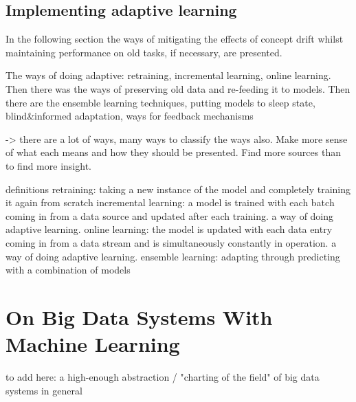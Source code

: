 


\subsection{Implementing adaptive learning}

In the following section the ways of mitigating the effects of concept drift whilst maintaining performance on old tasks, if necessary, are presented.

The ways of doing adaptive: retraining, incremental learning, online learning. Then there was the ways of preserving old data and re-feeding it to models. Then there are the ensemble learning techniques, putting models to sleep state, blind&informed adaptation, ways for feedback mechanisms

-> there are a lot of ways, many ways to classify the ways also. Make more sense of what each means and how they should be presented. Find more sources than \cite{conceptdriftsurvey} to find more insight.

definitions
 retraining: taking a new instance of the model and completely training it again from scratch
	    incremental learning: a model is trained with each batch coming in from a data source and updated after each training. a way of doing adaptive learning.
	    online learning: the model is updated with each data entry coming in from a data stream and is simultaneously constantly in operation. a way of doing adaptive learning.
	    ensemble learning: adapting through predicting with a combination of models

\section{On Big Data Systems With Machine Learning}


to add here: a high-enough abstraction / "charting of the field" of big data systems in general

